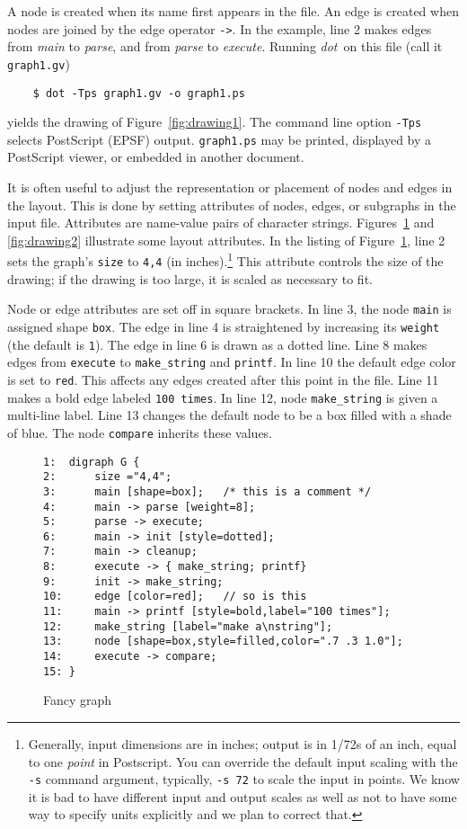 \documentclass[11pt]{article}
\def\dot{{\it dot}}
\begin{document}
A node is created when its name first appears in the file.
An edge is created when nodes are joined by the edge operator \verb"->".
In the example, line 2 makes edges from {\it main} to {\it parse},
and from {\it parse} to {\it execute}.
Running \dot\ on this file (call it \verb"graph1.gv")
\begin{verbatim}
    $ dot -Tps graph1.gv -o graph1.ps
\end{verbatim}
yields the drawing of Figure~\ref{fig:drawing1}.
The command line option \verb"-Tps" selects PostScript (EPSF) output. 
\verb"graph1.ps" may be printed, displayed by a PostScript viewer,
or embedded in another document.

It is often useful to adjust the representation or placement of nodes
and edges in the layout.  This is done by setting attributes of nodes,
edges, or subgraphs in the input file.
Attributes are name-value pairs of character strings.
Figures~\ref{fig:graph2} and \ref{fig:drawing2} illustrate
some layout attributes.  In the listing of Figure~\ref{fig:graph2},
line 2 sets the graph's {\tt size} to {\tt 4,4}
(in inches).\footnote{Generally, input dimensions are in inches;
output is in 1/72s of an inch, equal to one {\it point} in Postscript.
You can override the default input scaling with the \verb"-s" command argument,
typically, \verb"-s 72" to scale the input in points. We know it is bad
to have different input and output scales as well as not to have some
way to specify units explicitly and we plan to correct that.}
This attribute controls the size of the drawing; if the drawing is
too large, it is scaled as necessary to fit.

Node or edge attributes are set off in square brackets.
In line 3, the node \verb"main" is assigned shape \verb"box".
The edge in line 4 is straightened by increasing its 
\verb"weight" (the default is \verb"1").
The edge in line 6 is drawn as a dotted line.
Line 8 makes edges from {\tt execute} to {\tt make\_string} and {\tt printf}.
In line 10 the default edge color is set to \verb"red".
This affects any edges created after this point in the file.
Line 11 makes a bold edge labeled {\tt 100 times}.
In line 12, node \verb"make_string" is given a multi-line label.
Line 13 changes the default node to be a box filled with a shade of blue.
The node {\tt compare} inherits these values.

\begin{figure}[p]
\begin{verbatim}
1:  digraph G {
2:      size ="4,4";
3:      main [shape=box];   /* this is a comment */
4:      main -> parse [weight=8];
5:      parse -> execute;
6:      main -> init [style=dotted];
7:      main -> cleanup;
8:      execute -> { make_string; printf}
9:      init -> make_string;
10:     edge [color=red];   // so is this
11:     main -> printf [style=bold,label="100 times"];
12:     make_string [label="make a\nstring"];
13:     node [shape=box,style=filled,color=".7 .3 1.0"];
14:     execute -> compare;
15: }
\end{verbatim}
\caption{Fancy graph}
\label{fig:graph2}
\end{figure}
\end{document}
